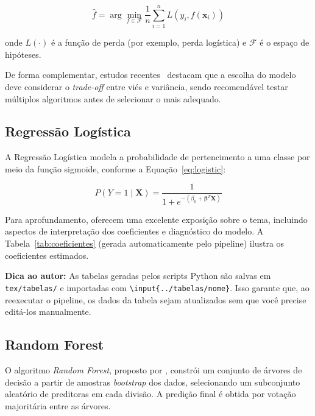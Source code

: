 \documentclass[
    article,
    12pt,
    oneside,
    a4paper,
    english,
    brazilian
    ]{abntex2}
\numberwithin{equation}{section}
\newenvironment{dica}{%
    \par\medskip
    \color{blue!60!black}\small\itshape
}{%
    \par\medskip
}
\begin{document}
\begin{equation}
    \hat{f} = \arg\min_{f \in \mathcal{F}} \frac{1}{n} \sum_{i=1}^{n} L(y_i, f(\mathbf{x}_i))
    \label{eq:risco_empirico}
\end{equation}

onde $L(\cdot)$ é a função de perda (por exemplo, perda logística) e $\mathcal{F}$ é o espaço de hipóteses.

De forma complementar, estudos recentes~\cite{pecanha2024} destacam que a escolha do modelo deve considerar o \textit{trade-off} entre viés e variância, sendo recomendável testar múltiplos algoritmos antes de selecionar o mais adequado.

\subsection{Regressão Logística}

A Regressão Logística modela a probabilidade de pertencimento a uma classe por meio da função sigmoide, conforme a Equação~\ref{eq:logistic}:

\begin{equation}
    P(Y = 1 \mid \mathbf{X}) = \frac{1}{1 + e^{-(\beta_0 + \boldsymbol{\beta}^T \mathbf{X})}}
    \label{eq:logistic}
\end{equation}

Para aprofundamento,  oferecem uma excelente exposição sobre o tema, incluindo aspectos de interpretação dos coeficientes e diagnóstico do modelo. A Tabela~\ref{tab:coeficientes} (gerada automaticamente pelo pipeline) ilustra os coeficientes estimados.



\begin{dica}
\noindent\textbf{Dica ao autor:} As tabelas geradas pelos scripts Python são salvas em \texttt{tex/tabelas/} e importadas com \texttt{\textbackslash input\{../tabelas/nome\}}. Isso garante que, ao reexecutar o pipeline, os dados da tabela sejam atualizados sem que você precise editá-los manualmente.
\end{dica}

\subsection{Random Forest}

O algoritmo \textit{Random Forest}, proposto por , constrói um conjunto de árvores de decisão a partir de amostras \textit{bootstrap} dos dados, selecionando um subconjunto aleatório de preditoras em cada divisão. A predição final é obtida por votação majoritária entre as árvores.
\end{document}
